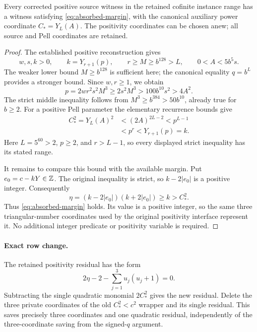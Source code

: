 \begin{proposition}
Every corrected positive source witness in the retained cofinite
instance range has a witness satisfying
\eqref{eq:absorbed-margin}, with the canonical auxiliary power
coordinate \(C_*=Y_L(A)\). The positivity coordinates can be chosen
anew; all source and Pell coordinates are retained.
\end{proposition}
\begin{proof}
The established positive reconstruction gives
\[
 w,s,k>0,\qquad k=Y_{r+1}(p),\qquad
 r\ge M\ge b^{128}>L,
 \qquad 0<A<5b^5s.
\]
The weaker lower bound \(M\ge b^{128}\) is sufficient here; the
canonical equality \(q=b^L\) provides a stronger bound. Since
\(w,r\ge1\), we obtain
\[
 p=2wr^2s^2M^3\ge2s^2M^3>100b^{10}s^2>4A^2.
\]
The strict middle inequality follows from
\(M^3\ge b^{384}>50b^{10}\), already true for \(b\ge2\).
For a positive Pell parameter the elementary recurrence bounds give
\[
 \begin{split}
 C_*^2=Y_L(A)^2
   &<(2A)^{2L-2}<p^{L-1}\\
   &<p^r<Y_{r+1}(p)=k.
 \end{split}
\]
Here \(L=5^{60}>2\), \(p\ge2\), and \(r>L-1\), so every
displayed strict inequality has its stated range.

It remains to compare this bound with the available margin. Put
\(e_0=c-kY\in\mathbb Z\). The original inequality is strict, so
\(k-2|e_0|\) is a positive integer. Consequently
\[
 \eta=(k-2|e_0|)(k+2|e_0|)\ge k>C_*^2.
\]
Thus \eqref{eq:absorbed-margin} holds. Its value is a positive
integer, so the same three triangular-number coordinates used by the
original positivity interface represent it. No additional integer
predicate or positivity variable is required.
\end{proof}

\paragraph{Exact row change.}
The retained positivity residual has the form
\[
       2\eta-2-\sum_{j=1}^3 u_j(u_j+1)=0.
\]
Subtracting the single quadratic monomial \(2C_*^2\) gives the
new residual. Delete the three private coordinates of the old
\(C_*^2<c^2\) wrapper and its single residual. This saves precisely
three coordinates and one quadratic residual, independently of the
three-coordinate saving from the signed-\(q\) argument.
